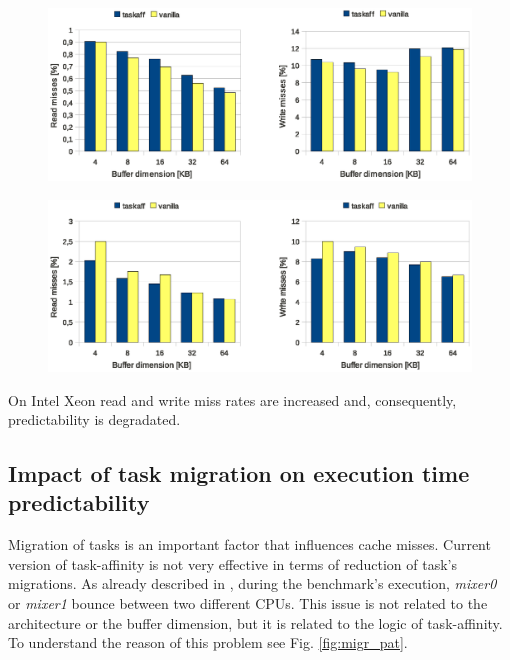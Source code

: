 \begin{figure}[htbp]
 \centering
  \includegraphics[width=\widefigure]{images/cache_miss/l1_load_store_Xeon.eps}
  \label{fig:l1_load_store_Xeon}
 \caption{}
\end{figure}

\begin{figure}[htbp]
 \centering
  \includegraphics[width=\widefigure]{images/cache_miss/l1_load_store_i7.eps}
  \label{fig:l1_load_store_i7}
 \caption{}
\end{figure}

On Intel Xeon read and write miss rates are increased and, consequently, predictability is degradated.

\subsection{Impact of task migration on execution time predictability}

Migration of tasks is an important factor that influences cache misses. Current version of task-affinity is not very effective in terms of reduction 
of task's migrations. As already described in \cite{lcs}, during the benchmark's execution, \textit{mixer0} or \textit{mixer1} bounce between two 
different CPUs. This issue is not related to the architecture or the buffer dimension, but it is related to the logic of task-affinity. To understand 
the reason of this problem see Fig. \ref{fig:migr_pat}.

